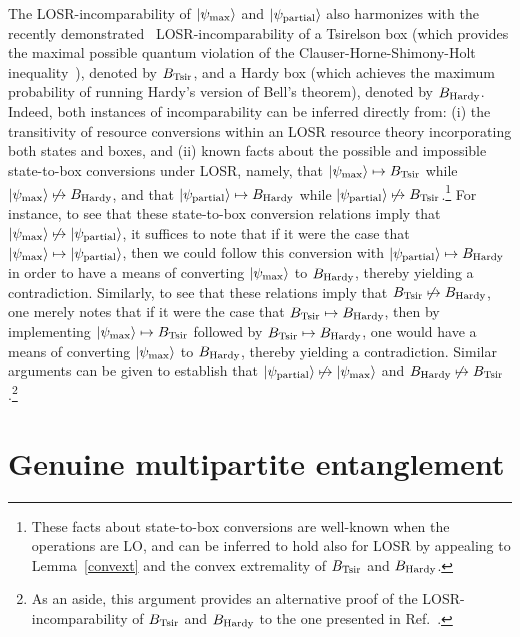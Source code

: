 \documentclass[prx,11pt,letterpaper,twocolumn,accepted=2023-11-27]{quantumarticle}
\newcommand{\ket}[1]{\left| #1 \right>}
\theoremstyle{plain}
\theoremstyle{definition}
\begin{document}
The LOSR-incomparability of $\ket{\psi_{\rm max}}$ and $\ket{\psi_{\rm partial}}$ also harmonizes with the recently demonstrated~\cite{wolfe2020quantifying} LOSR-incomparability of a Tsirelson box (which provides the maximal possible quantum violation of the  Clauser-Horne-Shimony-Holt inequality~\cite{CHSH}), denoted by $B_{\rm Tsir}$, and a Hardy box (which achieves the maximum
 probability of running Hardy's version of Bell's theorem), denoted by $B_{\rm Hardy}$. 
Indeed, both instances of incomparability can be inferred directly from: (i) the transitivity of resource conversions within an LOSR resource theory incorporating both states and boxes, and (ii)
known facts about the possible and impossible state-to-box conversions under LOSR, namely, that $\ket{\psi_{\rm max}} \mapsto B_{\rm Tsir}$ while  $\ket{\psi_{\rm max}} \not\mapsto B_{\rm Hardy}$, and that $\ket{\psi_{\rm partial}} \mapsto B_{\rm Hardy}$ while $\ket{\psi_{\rm partial}} \not\mapsto B_{\rm Tsir}$.\footnote{These facts about state-to-box conversions are well-known when the operations are LO, and can be inferred to hold also for LOSR by appealing to Lemma~\ref{convext} and the convex extremality of $B_{\rm Tsir}$ and $B_{\rm Hardy}$.}
  For instance, to see that these state-to-box conversion relations imply that $\ket{\psi_{\rm max}} \not\mapsto \ket{\psi_{\rm partial}}$, it suffices to note that if it were the case that $\ket{\psi_{\rm max}} \mapsto \ket{\psi_{\rm partial}}$, then we could follow this conversion with $\ket{\psi_{\rm partial}} \mapsto B_{\rm Hardy}$ in order to have a means of converting $\ket{\psi_{\rm max}}$ to $B_{\rm Hardy}$,  thereby yielding a contradiction.  Similarly, to see that these relations imply that $B_{\rm Tsir} \not\mapsto B_{\rm Hardy}$, one merely notes that if it were the case that $B_{\rm Tsir} \mapsto B_{\rm Hardy}$, then by implementing $\ket{\psi_{\rm max}} \mapsto B_{\rm Tsir}$ followed by $B_{\rm Tsir} \mapsto B_{\rm Hardy}$, one would have a means of converting $\ket{\psi_{\rm max}}$ to $B_{\rm Hardy}$, thereby yielding a contradiction.  Similar arguments can be given to establish that $\ket{\psi_{\rm partial}} \not\mapsto \ket{\psi_{\rm max}}$ and $B_{\rm Hardy} \not\mapsto B_{\rm Tsir}$.\footnote{As an aside, this argument provides an alternative proof of the LOSR-incomparability of $B_{\rm Tsir}$ and $B_{\rm Hardy}$ to the one presented in Ref.~\cite{wolfe2020quantifying}.}



\section{Genuine multipartite entanglement}\label{sec:multipartite}
\end{document}
